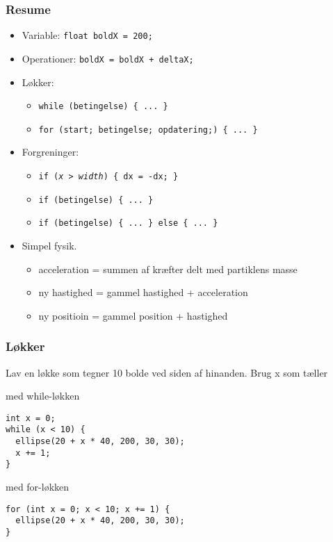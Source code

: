 \documentclass{beamer}
\begin{document}
\begin{frame}[fragile]
  \frametitle{Resume}
  
  \begin{itemize}
  \item Variable: \texttt{float boldX = 200;}\\
  \item Operationer: \texttt{boldX = boldX + deltaX;}\\
  \item Løkker:
    \begin{itemize}
    \item \texttt{while (betingelse) \{ ... \}}\\
    \item \texttt{for (start; betingelse; opdatering;) \{ ... \}}\\
    \end{itemize}
  \item Forgreninger: 
    \begin{itemize}
    \item \texttt{if (\emph{x > width}) \{ dx = -dx; \}}\\
    \item \texttt{if (betingelse) \{ ... \}}\\
    \item \texttt{if (betingelse) \{ ... \} else \{ ... \}}\\
    \end{itemize}
  \item Simpel fysik.
    \begin{itemize}
    \item acceleration = summen af kræfter delt med partiklens masse
    \item ny hastighed = gammel hastighed + acceleration
    \item ny positioin = gammel position + hastighed
    \end{itemize}
  \end{itemize}  
\end{frame}

\begin{frame}[fragile]
  \frametitle{Løkker}

  Lav en løkke som tegner 10 bolde ved siden af hinanden. Brug x som tæller
  \begin{block}{med while-løkken}  
\begin{verbatim}
int x = 0;
while (x < 10) {
  ellipse(20 + x * 40, 200, 30, 30);
  x += 1;
}
\end{verbatim}  
  \end{block}
  
  \begin{block}{med for-løkken}
\begin{verbatim}
for (int x = 0; x < 10; x += 1) {
  ellipse(20 + x * 40, 200, 30, 30);
}
\end{verbatim}  
  \end{block}
    
\end{frame}
\end{document}
